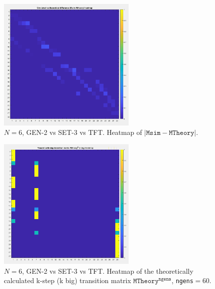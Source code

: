 \documentclass[12pt]{report}
\begin{document}
\begin{figure}[h!]
    \centering
    \includegraphics[width=0.6\textwidth]{A3-MTheory-MsimHeatmap.png}
    \caption{$N=6$, GEN-2 vs SET-3 vs TFT. Heatmap of $|\texttt{Msim}-\texttt{MTheory}|$.}
    \label{A3}
\end{figure}

\begin{figure}[h!]
    \centering
    \includegraphics[width=0.6\textwidth]{A4-MTheorykHeatmap.png}
    \caption{$N=6$, GEN-2 vs SET-3 vs TFT. Heatmap of the theoretically calculated k-step (k big) transition matrix $\texttt{MTheory}^{\texttt{ngens}}$, \texttt{ngens}$=60$.}
    \label{A4}
\end{figure}
\end{document}
